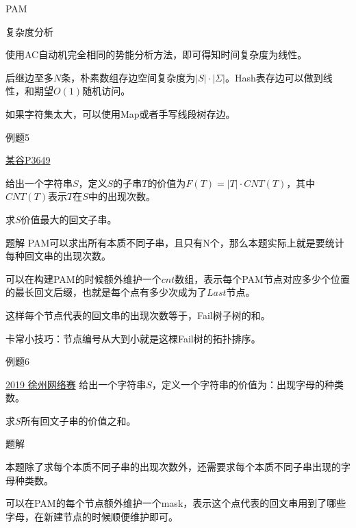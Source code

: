 \documentclass{ctexbeamer}		%
\begin{document}
\begin{frame}{PAM}
    
\begin{block}{复杂度分析}

使用AC自动机完全相同的势能分析方法，即可得知时间复杂度为线性。

后继边至多$N$条，朴素数组存边空间复杂度为$|S|\cdot|\Sigma|$。Hash表存边可以做到线性，和期望$O(1)$随机访问。

如果字符集太大，可以使用Map或者手写线段树存边。

\end{block}

\end{frame}
\begin{frame}{例题5}

\begin{block}{\href{https://www.luogu.com.cn/problem/P3649}{某谷P3649}}

给出一个字符串$S$，定义$S$的子串$T$的价值为$F(T) = |T| \cdot CNT(T)$，其中$CNT(T)$表示$T$在$S$中的出现次数。

求$S$价值最大的回文子串。

\end{block}
    
\pause

\begin{block}{题解}
PAM可以求出所有本质不同子串，且只有N个，那么本题实际上就是要统计每种回文串的出现次数。

\pause

可以在构建PAM的时候额外维护一个$cnt$数组，表示每个PAM节点对应多少个位置的最长回文后缀，也就是每个点有多少次成为了$Last$节点。

\pause

这样每个节点代表的回文串的出现次数等于，Fail树子树的和。

卡常小技巧：节点编号从大到小就是这棵Fail树的拓扑排序。

\end{block}

\end{frame}


\begin{frame}{例题6}

\begin{block}{\href{https://nanti.jisuanke.com/t/41389}{2019 徐州网络赛}}
给出一个字符串$S$，定义一个字符串的价值为：出现字母的种类数。

求$S$所有回文子串的价值之和。

\end{block}

\pause

\begin{block}{题解}

本题除了求每个本质不同子串的出现次数外，还需要求每个本质不同子串出现的字母种类数。

可以在PAM的每个节点额外维护一个mask，表示这个点代表的回文串用到了哪些字母，在新建节点的时候顺便维护即可。

\end{block}
\end{frame}
\end{document}
